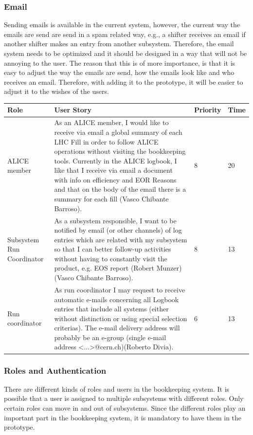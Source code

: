 \documentclass[paper=a4, fontsize=11pt,twoside]{scrartcl}	%
\begin{document}
\subsubsection{Email}
Sending emails is available in the current system, however, the current way the emails are send are send in a spam related way, e.g., a shifter receives an email if another shifter makes an entry from another subsystem. Therefore, the email system needs to be optimized and it should be designed in a way that will not be annoying to the user. The reason that this is of more importance, is that it is easy to adjust the way the emails are send, how the emails look like and who receives an email. Therefore, with adding it to the prototype, it will be easier to adjust it to the wishes of the users.
\begin{longtable}{ | p{3cm} | p{8cm} | p{1cm} | l |}
\hline
Role & User Story & Priority & Time \\ \hline
ALICE member & As an ALICE member, I would like to receive via email a global summary of each LHC Fill in order to follow ALICE operations without visiting the bookkeeping tools. Currently in the ALICE logbook, I like that I receive via email a document with info on efficiency and EOR Reasons and that on the body of the email there is a summary for
each fill (Vasco Chibante Barroso). & 8 & 20 \\ \hline
Subsystem Run Coordinator &  As a subsystem responsible, I want to be notified by email (or other
channels) of log entries which are related with my subsystem so that I can better follow-up activities without having to constantly visit the product, e.g. EOS report (Robert Munzer) (Vasco Chibante Barroso). & 8 & 13 \\ \hline
Run coordinator & As run coordinator I may request to receive automatic e-mails concerning all Logbook entries that include all systems (either without distinction or using special selection criterias). The e-mail delivery address will probably be an e-group (single e-mail address <...>@cern.ch)(Roberto Divia). & 6 & 13 \\ \hline
\end{longtable}

\subsubsection{Roles and Authentication}
There are different kinds of roles and users in the bookkeeping system. It is possible that a user is assigned to multiple subsystems with different roles. Only certain roles can move in and out of subsystems. Since the different roles play an important part in the bookkeeping system, it is mandatory to have them in the prototype.
\end{document}
